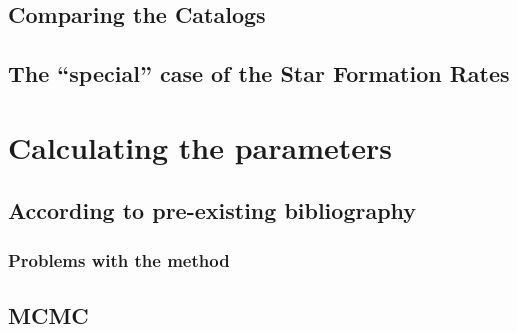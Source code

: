 \documentclass[
]{article}
\begin{document}
\subsection{Comparing the Catalogs}\label{comparing-the-catalogs}

\subsection{The ``special'' case of the Star Formation
Rates}\label{the-special-case-of-the-star-formation-rates}

\section{Calculating the parameters}\label{calculating-the-parameters}

\subsection{According to pre-existing
bibliography}\label{according-to-pre-existing-bibliography}

\subsubsection{Problems with the method}\label{problems-with-the-method}

\subsection*{MCMC}\label{mcmc}
\end{document}
